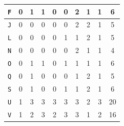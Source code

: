\documentclass[submit]{ipsj}
\begin{document}
\begin{table}[t]
\begin{minipage}[t]{0.5\linewidth}
{\begin{tabular}{c|c|cccccccc}
\texttt{\large{F}}                   & 0                                           & \multicolumn{1}{c|}{1} & \multicolumn{1}{c|}{1} & \multicolumn{1}{c|}{0} & \multicolumn{1}{c|}{0} & \multicolumn{1}{c|}{2} & \multicolumn{1}{c|}{1} & \multicolumn{1}{c|}{1} & 6  \\ \hline
\texttt{\large{J}}                   & 0                                           & \multicolumn{1}{c|}{0} & \multicolumn{1}{c|}{0} & \multicolumn{1}{c|}{0} & \multicolumn{1}{c|}{0} & \multicolumn{1}{c|}{2} & \multicolumn{1}{c|}{2} & \multicolumn{1}{c|}{1} & 5  \\ \hline
\rowcolor{blue!30}%
\texttt{\large{L}}                   & 0                                           & \multicolumn{1}{c|}{0} & \multicolumn{1}{c|}{0} & \multicolumn{1}{c|}{0} & \multicolumn{1}{c|}{1} & \multicolumn{1}{c|}{1} & \multicolumn{1}{c|}{2} & \multicolumn{1}{c|}{1} & 5  \\ \hline
\rowcolor{blue!30}%
\texttt{\large{N}}                   & 0                                           & \multicolumn{1}{c|}{0} & \multicolumn{1}{c|}{0} & \multicolumn{1}{c|}{0} & \multicolumn{1}{c|}{0} & \multicolumn{1}{c|}{2} & \multicolumn{1}{c|}{1} & \multicolumn{1}{c|}{1} & 4  \\ \hline
\texttt{\large{O}}                   & 0                                           & \multicolumn{1}{c|}{1} & \multicolumn{1}{c|}{1} & \multicolumn{1}{c|}{0} & \multicolumn{1}{c|}{1} & \multicolumn{1}{c|}{1} & \multicolumn{1}{c|}{1} & \multicolumn{1}{c|}{1} & 6  \\ \hline
\rowcolor{blue!30}%
\texttt{\large{Q}}                   & 0                                           & \multicolumn{1}{c|}{1} & \multicolumn{1}{c|}{0} & \multicolumn{1}{c|}{0} & \multicolumn{1}{c|}{0} & \multicolumn{1}{c|}{1} & \multicolumn{1}{c|}{2} & \multicolumn{1}{c|}{1} & 5  \\ \hline
\texttt{\large{S}}                   & 0                                           & \multicolumn{1}{c|}{1} & \multicolumn{1}{c|}{0} & \multicolumn{1}{c|}{0} & \multicolumn{1}{c|}{1} & \multicolumn{1}{c|}{1} & \multicolumn{1}{c|}{2} & \multicolumn{1}{c|}{1} & 6  \\ \hline
\texttt{\large{U}}                   & 1                                           & \multicolumn{1}{c|}{3} & \multicolumn{1}{c|}{3} & \multicolumn{1}{c|}{3} & \multicolumn{1}{c|}{3} & \multicolumn{1}{c|}{3} & \multicolumn{1}{c|}{2} & \multicolumn{1}{c|}{3} & 20 \\ \hline
\texttt{\large{V}}                   & 1                                           & \multicolumn{1}{c|}{2} & \multicolumn{1}{c|}{3} & \multicolumn{1}{c|}{2} & \multicolumn{1}{c|}{3} & \multicolumn{1}{c|}{3} & \multicolumn{1}{c|}{1} & \multicolumn{1}{c|}{2} & 16 \\ \hline

\end{tabular}}
\end{minipage}
\end{table}
\end{document}
